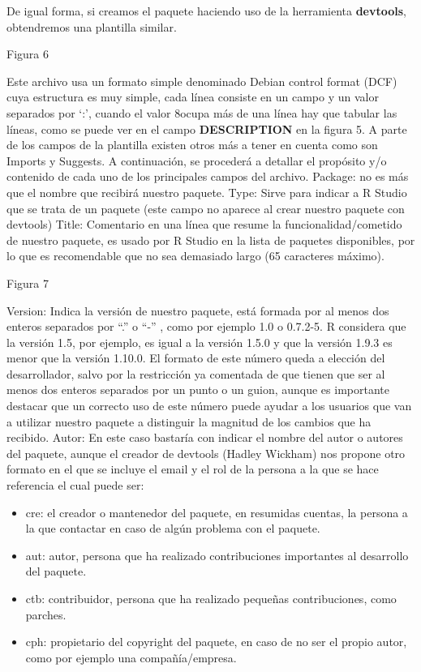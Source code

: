 De igual forma, si creamos el paquete haciendo uso de la herramienta \textbf{devtools}, obtendremos
una plantilla similar.

Figura 6

Este archivo usa un formato simple denominado Debian control format (DCF) cuya estructura
es muy simple, cada l\'inea consiste en un campo y un valor separados por \enquote*{:}, cuando el valor
8ocupa m\'as de una l\'inea hay que tabular las l\'ineas, como se puede ver en el campo
\textbf{DESCRIPTION} en la figura 5.
A parte de los campos de la plantilla existen otros m\'as a tener en cuenta como son Imports
y Suggests. A continuaci\'on, se proceder\'a a detallar el prop\'osito y/o contenido de cada uno
de los principales campos del archivo.
Package: no es m\'as que el nombre que recibir\'a nuestro paquete.
Type: Sirve para indicar a R Studio que se trata de un paquete (este campo no aparece al
crear nuestro paquete con devtools)
Title: Comentario en una l\'inea que resume la funcionalidad/cometido de nuestro paquete, es
usado por R Studio en la lista de paquetes disponibles, por lo que es recomendable que no
sea demasiado largo (65 caracteres m\'aximo).

Figura 7

Version: Indica la versi\'on de nuestro paquete, est\'a formada por al menos dos enteros
separados por “.” o “-” , como por ejemplo 1.0 o 0.7.2-5. R considera que la versi\'on 1.5, por
ejemplo, es igual a la versi\'on 1.5.0 y que la versi\'on 1.9.3 es menor que la versi\'on 1.10.0.
El formato de este n\'umero queda a elecci\'on del desarrollador, salvo por la restricci\'on ya
comentada de que tienen que ser al menos dos enteros separados por un punto o un guion,
aunque es importante destacar que un correcto uso de este n\'umero puede ayudar a los
usuarios que van a utilizar nuestro paquete a distinguir la magnitud de los cambios que ha
recibido.
Autor: En este caso bastar\'ia con indicar el nombre del autor o autores del paquete, aunque
el creador de devtools (Hadley Wickham) nos propone otro formato en el que se incluye el
email y el rol de la persona a la que se hace referencia el cual puede ser:

\begin{itemize}
    \item cre: el creador o mantenedor del paquete, en resumidas cuentas, la persona a la que
contactar en caso de alg\'un problema con el paquete.
    \item aut: autor, persona que ha realizado contribuciones importantes al desarrollo del
paquete.
    \item ctb: contribuidor, persona que ha realizado peque\~nas contribuciones, como parches.
    \item cph: propietario del copyright del paquete, en caso de no ser el propio autor, como
por ejemplo una compa\~n\'ia/empresa.
\end{itemize}

